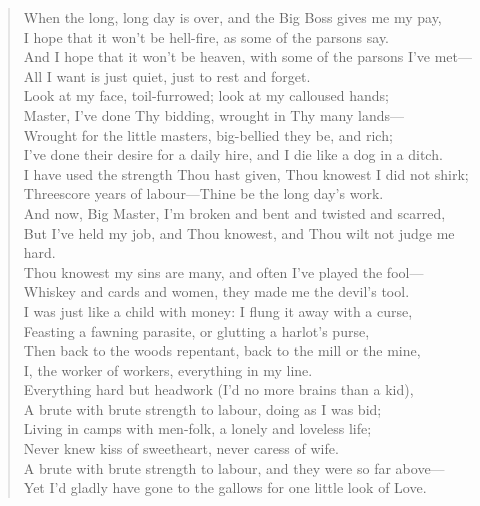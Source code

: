 

\begin{verse}
When the long, long day is over, and the Big Boss gives me my pay,\\
I hope that it won't be hell-fire, as some of the parsons say.\\
And I hope that it won't be heaven, with some of the parsons I've met—\\
All I want is just quiet, just to rest and forget.\\
Look at my face, toil-furrowed; look at my calloused hands;\\
Master, I've done Thy bidding, wrought in Thy many lands—\\
Wrought for the little masters, big-bellied they be, and rich;\\
I've done their desire for a daily hire, and I die like a dog in a ditch.\\
I have used the strength Thou hast given, Thou knowest I did not shirk;\\
Threescore years of labour—Thine be the long day's work.\\
And now, Big Master, I'm broken and bent and twisted and scarred,\\
But I've held my job, and Thou knowest, and Thou wilt not judge me hard.\\
Thou knowest my sins are many, and often I've played the fool—\\
Whiskey and cards and women, they made me the devil's tool.\\
I was just like a child with money: I flung it away with a curse,\\
Feasting a fawning parasite, or glutting a harlot's purse,\\
Then back to the woods repentant, back to the mill or the mine,\\
I, the worker of workers, everything in my line.\\
Everything hard but headwork (I'd no more brains than a kid),\\
A brute with brute strength to labour, doing as I was bid;\\
Living in camps with men-folk, a lonely and loveless life;\\
Never knew kiss of sweetheart, never caress of wife.\\
A brute with brute strength to labour, and they were so far above—\\
Yet I'd gladly have gone to the gallows for one little look of Love.\\

\end{verse}
